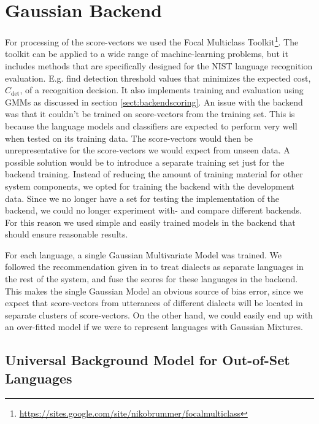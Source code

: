 \section{Gaussian Backend}
\label{sect:implgaussback}

For processing of the score-vectors we used the Focal Multiclass Toolkit\footnote{\url{https://sites.google.com/site/nikobrummer/focalmulticlass}}. The toolkit can be applied to a wide range of machine-learning problems, but it includes methods that are specifically designed for the NIST language recognition evaluation.  E.g. find detection threshold values that minimizes the expected cost, $C_{\text{det}}$, of a recognition decision. It also implements training and evaluation using GMMs as discussed in section \ref{sect:backendscoring}. An issue with the backend was that it couldn't be trained on score-vectors from the training set. This is because the language models and classifiers are expected to perform very well  when tested on its training data. The score-vectors would then be unrepresentative for the score-vectors we would expect from unseen data. A possible solution would be to introduce a separate training set just for the backend training. Instead of reducing the amount of training material for other system components, we opted for training the backend with the development data. Since we no longer have a set for testing the implementation of the backend, we could no longer experiment with- and compare different backends. For this reason we used simple and easily trained models in the backend that should ensure reasonable results. 

For each language, a single Gaussian Multivariate Model was trained. We followed the recommendation given in \cite[p. 70]{matejkalre} to treat dialects as separate languages in the rest of the system, and fuse the scores for these languages in the backend. This makes the single Gaussian Model an obvious source of bias error, since we expect that score-vectors from utterances of different dialects will be located in separate clusters of score-vectors. On the other hand, we could easily end up with an over-fitted model if we were to represent languages with Gaussian Mixtures. 

\subsection{Universal Background Model for Out-of-Set Languages}

